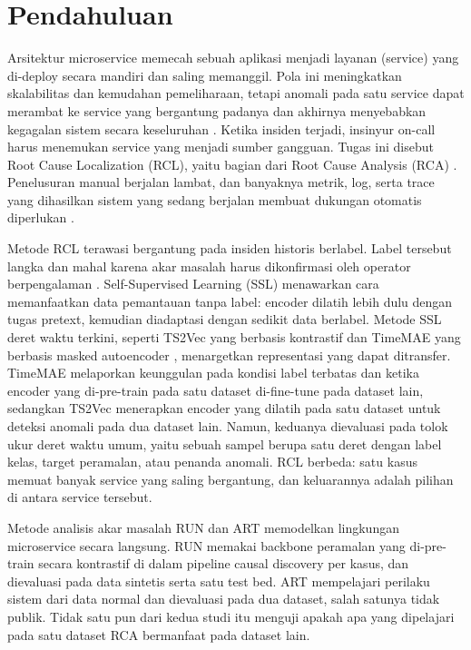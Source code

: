 \section{Pendahuluan}
Arsitektur microservice memecah sebuah aplikasi menjadi layanan (service) yang di-deploy secara mandiri dan saling memanggil. Pola ini meningkatkan skalabilitas dan kemudahan pemeliharaan, tetapi anomali pada satu service dapat merambat ke service yang bergantung padanya dan akhirnya menyebabkan kegagalan sistem secara keseluruhan \cite{lin2024run}. Ketika insiden terjadi, insinyur on-call harus menemukan service yang menjadi sumber gangguan. Tugas ini disebut Root Cause Localization (RCL), yaitu bagian dari Root Cause Analysis (RCA) \cite{sun2024art}. Penelusuran manual berjalan lambat, dan banyaknya metrik, log, serta trace yang dihasilkan sistem yang sedang berjalan membuat dukungan otomatis diperlukan \cite{pham2024rcaeval}.

Metode RCL terawasi bergantung pada insiden historis berlabel. Label tersebut langka dan mahal karena akar masalah harus dikonfirmasi oleh operator berpengalaman \cite{sun2024art}. Self-Supervised Learning (SSL) menawarkan cara memanfaatkan data pemantauan tanpa label: encoder dilatih lebih dulu dengan tugas pretext, kemudian diadaptasi dengan sedikit data berlabel. Metode SSL deret waktu terkini, seperti TS2Vec yang berbasis kontrastif \cite{yue2022ts2vec} dan TimeMAE yang berbasis masked autoencoder \cite{cheng2026timemae}, menargetkan representasi yang dapat ditransfer. TimeMAE melaporkan keunggulan pada kondisi label terbatas dan ketika encoder yang di-pre-train pada satu dataset di-fine-tune pada dataset lain, sedangkan TS2Vec menerapkan encoder yang dilatih pada satu dataset untuk deteksi anomali pada dua dataset lain. Namun, keduanya dievaluasi pada tolok ukur deret waktu umum, yaitu sebuah sampel berupa satu deret dengan label kelas, target peramalan, atau penanda anomali. RCL berbeda: satu kasus memuat banyak service yang saling bergantung, dan keluarannya adalah pilihan di antara service tersebut.

Metode analisis akar masalah RUN \cite{lin2024run} dan ART \cite{sun2024art} memodelkan lingkungan microservice secara langsung. RUN memakai backbone peramalan yang di-pre-train secara kontrastif di dalam pipeline causal discovery per kasus, dan dievaluasi pada data sintetis serta satu test bed. ART mempelajari perilaku sistem dari data normal dan dievaluasi pada dua dataset, salah satunya tidak publik. Tidak satu pun dari kedua studi itu menguji apakah apa yang dipelajari pada satu dataset RCA bermanfaat pada dataset lain.

